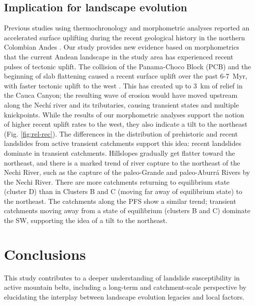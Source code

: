 \documentclass[draft]{agujournal2019}
\begin{document}
\subsection{Implication for landscape evolution}
\par Previous studies using thermochronology and morphometric analyses reported an accelerated surface uplifting during the recent geological history in the northern Colombian Andes \cite{restrepo2019, Noriega2020, perez2021, perez2022, ott2023}. Our study provides new evidence based on morphometrics that the current Andean landscape in the study area has experienced recent pulses of tectonic uplift. The collision of the Panama-Choco Block (PCB) and the beginning of slab flattening caused a recent surface uplift over the past 6-7~Myr, with faster tectonic uplift to the west \cite{perez2021, ott2023}. This has created up to 3~km of relief in the Cauca Canyon; the resulting wave of erosion would have moved upstream along the Nechí river and its tributaries, causing transient states and multiple knickpoints. While the results of our morphometric analyses support the notion of higher recent uplift rates to the west, they also indicate a tilt to the northeast (Fig. \ref{fig:rel-rec}). The differences in the distribution of prehistoric and recent landslides from active transient catchments support this idea: recent landslides dominate in transient catchments. Hillslopes gradually get flatter toward the northeast, and there is a marked trend of river capture to the northeast of the Nechi River, such as the capture of the paleo-Grande and paleo-Aburrá Rivers by the Nechi River. There are more catchments returning to equilibrium state (cluster D) than in Clusters B and C (moving far away of equilibrium state) to the northeast. The catchments along the PFS show a similar trend; transient catchments moving away from a state of equilibrium (clusters B and C) dominate the SW, supporting the idea of a tilt to the northeast. 

\section{Conclusions}

\par This study contributes to a deeper understanding of landslide susceptibility in active mountain belts, including a long-term and catchment-scale perspective by elucidating the interplay between landscape evolution legacies and local factors. 
\end{document}
